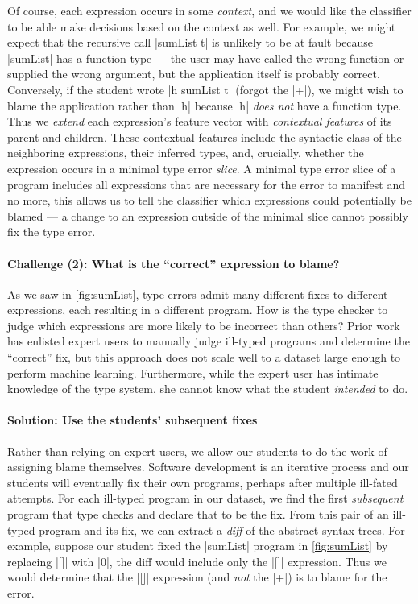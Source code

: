 Of course, each expression occurs in some \emph{context}, and we would
like the classifier to be able make decisions based on the context as
well.
%
For example, we might expect that the recursive call |sumList t| is
unlikely to be at fault because |sumList| has a function type --- the
user may have called the wrong function or supplied the wrong argument,
but the application itself is probably correct.
%
Conversely, if the student wrote |h sumList t| (\ie forgot the |+|), we
might wish to blame the application rather than |h| because |h|
\emph{does not} have a function type.
%
Thus we \emph{extend} each expression's feature vector with
\emph{contextual features} of its parent and children.
%
These contextual features include the syntactic class of the neighboring
expressions, their inferred types, and, crucially, whether the
expression occurs in a minimal type error \emph{slice}.
%
A minimal type error slice of a program includes all expressions that
are necessary for the error to manifest and no more, this allows us to
tell the classifier which expressions could potentially be blamed ---
a change to an expression outside of the minimal slice cannot possibly
fix the type error.

\paragraph{\textbf{Challenge (2): What is the ``correct'' expression to blame?}}
As we saw in \autoref{fig:sumList}, type errors admit many different
fixes to different expressions, each resulting in a different program.
%
How is the type checker to judge which expressions are more likely to be
incorrect than others?
%
Prior work has enlisted expert users to manually judge ill-typed
programs and determine the ``correct'' fix, but this approach does not
scale well to a dataset large enough to perform machine learning.
%
Furthermore, while the expert user has intimate knowledge of the type
system, she cannot know what the student \emph{intended} to do.

\paragraph{\textbf{Solution: Use the students' subsequent fixes}}
%
Rather than relying on expert users, we allow our students to do the
work of assigning blame themselves.
%
Software development is an iterative process and our students will
eventually fix their own programs, perhaps after multiple ill-fated
attempts.
%
For each ill-typed program in our dataset, we find the first
\emph{subsequent} program that type checks and declare that to be the
fix.
%
From this pair of an ill-typed program and its fix, we can extract a
\emph{diff} of the abstract syntax trees.
%
For example, suppose our student fixed the |sumList| program in
\autoref{fig:sumList} by replacing |[]| with |0|, the diff would include
only the |[]| expression.
%
Thus we would determine that the |[]| expression (and \emph{not} the
|+|) is to blame for the error.


